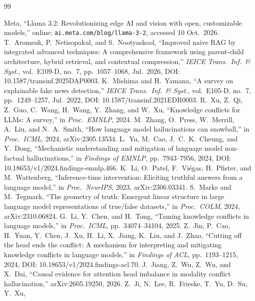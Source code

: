\documentclass[paper]{ieice}
\begin{document}
\begin{thebibliography}{99}

 Meta, ``Llama 3.2: Revolutionizing edge AI and
vision with open, customizable models,'' online:
\texttt{ai.meta.com/\allowbreak blog/\allowbreak llama-3-2},
accessed 10 Oct.\ 2026.
 T.~Aromsuk, P.~Netisopakul, and S.~Nootyaskool,
``Improved naive RAG by integrated advanced techniques: A comprehensive
framework using parent-child architecture, hybrid retrieval, and
contextual compression,''
\emph{IEICE Trans.\ Inf.\ \& Syst.}, vol.~E109-D, no.~7,
pp.~1057--1068, Jul.~2026,
DOI: 10.1587/transinf.2025DAP0003.
 K.~Mishima and H.~Yamana,
``A survey on explainable fake news detection,''
\emph{IEICE Trans.\ Inf.\ \& Syst.}, vol.~E105-D, no.~7, pp.~1249--1257,
Jul.~2022, DOI: 10.1587/transinf.2021EDR0003.
 R.~Xu, Z.~Qi, Z.~Guo, C.~Wang, H.~Wang, Y.~Zhang, and W.~Xu,
``Knowledge conflicts for LLMs: A survey,'' in \emph{Proc.\ EMNLP}, 2024.
 M.~Zhang, O.~Press, W.~Merrill, A.~Liu, and N.~A.~Smith,
``How language model hallucinations can snowball,'' in \emph{Proc.\ ICML}, 2024,
arXiv:2305.13534.
 L.~Yu, M.~Cao, J.~C.~K.~Cheung, and Y.~Dong,
``Mechanistic understanding and mitigation of language model non-factual hallucinations,''
in \emph{Findings of EMNLP}, pp.~7943--7956, 2024,
DOI: 10.18653/v1/2024.findings-emnlp.466.
 K.~Li, O.~Patel, F.~Vi\'egas, H.~Pfister, and M.~Wattenberg,
``Inference-time intervention: Eliciting truthful answers from a language model,''
in \emph{Proc.\ NeurIPS}, 2023, arXiv:2306.03341.
 S.~Marks and M.~Tegmark,
``The geometry of truth: Emergent linear structure in large language model representations of true/false datasets,''
in \emph{Proc.\ COLM}, 2024, arXiv:2310.06824.
 G.~Li, Y.~Chen, and H.~Tong,
``Taming knowledge conflicts in language models,'' in \emph{Proc.\ ICML},
pp.~34074--34104, 2025.
 Z.~Jin, P.~Cao, H.~Yuan, Y.~Chen, J.~Xu, H.~Li,
X.~Jiang, K.~Liu, and J.~Zhao,
``Cutting off the head ends the conflict: A mechanism for interpreting
and mitigating knowledge conflicts in language models,''
in \emph{Findings of ACL}, pp.~1193--1215, 2024,
DOI: 10.18653/v1/2024.findings-acl.70.
 J.~Jiang, Z.~Wu, Z.~Wu, and X.~Dai,
``Causal evidence for attention head imbalance in modality conflict hallucination,''
arXiv:2605.19250, 2026.
 Z.~Ji, N.~Lee, R.~Frieske, T.~Yu, D.~Su, Y.~Xu,

\end{thebibliography}
\end{document}

